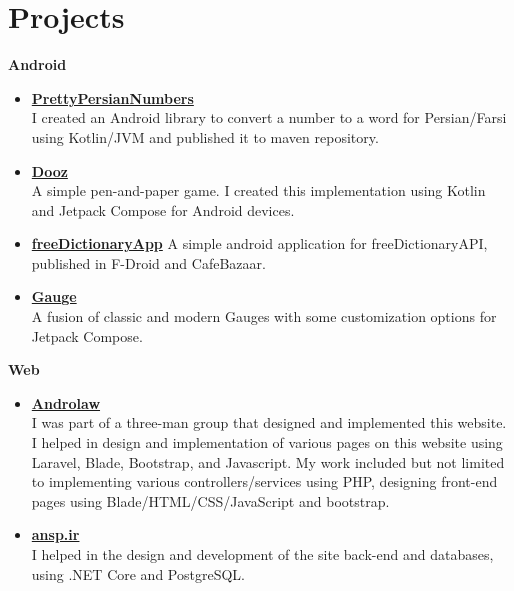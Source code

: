 \section*{\LARGE{Projects}}
\begin{multicols}{2}
    \begin{description}
        \item \textbf{Android}
        \begin{itemize}
            \item \href{https://github.com/yamin8000/PrettyPersianNumbers}{\textbf{PrettyPersianNumbers}}\\
            I created an Android library to convert a number to a word for Persian/Farsi using Kotlin/JVM
            and published it to maven repository.
            \item \href{https://github.com/yamin8000/Dooz}{\textbf{Dooz}}\\
            A simple pen-and-paper game.
            I created this implementation using Kotlin and Jetpack Compose for Android devices.
            \item \href{https://github.com/yamin8000/freeDictionaryApp}{\textbf{freeDictionaryApp}}
            A simple android application for freeDictionaryAPI, published in F-Droid and CafeBazaar.
            \item \href{https://github.com/yamin8000/Gauge}{\textbf{Gauge}}\\
            A fusion of classic and modern Gauges with some customization options for Jetpack Compose.
        \end{itemize}
        \item \textbf{Web}
        \begin {itemize}
            \item \href{https://andro.law}{\textbf{Androlaw}}\\
            I was part of a three-man group that designed and implemented this website.
            I helped in design and implementation of various pages on this website using Laravel, Blade, Bootstrap, and Javascript.
            My work included but not limited to implementing various controllers/services using PHP, designing front-end pages using Blade/HTML/CSS/JavaScript and bootstrap.
            \item \href{https://ansp.ir}{\textbf{ansp.ir}}\\
            I helped in the design and development of the site back-end and databases,
            using .NET Core and PostgreSQL\@.
        \end{itemize}

\end{description}
\end{multicols}
